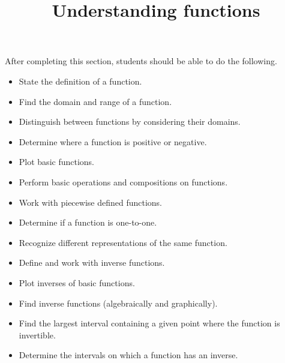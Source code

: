 \documentclass{ximera}
\title{Understanding functions}
\begin{document}
\begin{abstract} 
\end{abstract}

\maketitle

\begin{sectionOutcomes}
After completing this section, students should be able to do the following.

\begin{itemize}
	\item State the definition of a function.
	\item Find the domain and range of a function.
	\item Distinguish between functions by considering their domains.
	\item Determine where a function is positive or negative.
	\item Plot basic functions.
    \item Perform basic operations and compositions on
          functions.
    \item Work with piecewise defined functions.
	\item Determine if a function is one-to-one.
	\item Recognize different representations of the same function.
    \item Define and work with inverse functions.
    \item Plot inverses of basic functions.
	\item Find inverse functions (algebraically and graphically).
    \item Find the largest interval containing a given point
          where the function is invertible.
	\item Determine the intervals on which a function has an inverse.
\end{itemize}
\end{sectionOutcomes}
\end{document}

